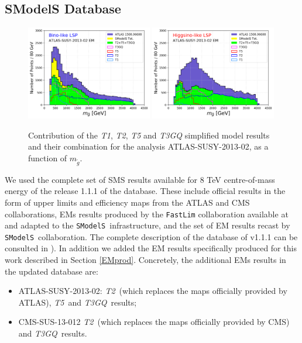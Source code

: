 \documentclass[preprint,number,sort&compress,twocolumn,3p]{elsstyarticle}
\newcommand{\SMO}{\texttt{SModelS\xspace}}
\newcommand{\MGLU}{$ m _{ \tilde g } $\xspace}
\newcommand{\TGQ}{ \textit{T3GQ}}
\newcommand{\Ttwo}{ \textit{T2}}
\newcommand{\Tfive}{ \textit{T5}}
\begin{document}
\subsection{SModelS Database}
\begin{figure}
	\begin{center}
		\subfigure
		{\includegraphics[width=0.49\textwidth]{PLOTS/Combination/Bino_Con.png}}
		\subfigure
		{\includegraphics[width=0.49\textwidth]{PLOTS/Combination/Higgsino_Con.png}}
	\end{center}
	\caption{Contribution of the \textit{T1}, \textit{T2}, \textit{T5} and \textit{T3GQ} simplified model results and their combination for the analysis ATLAS-SUSY-2013-02, as a function of \MGLU.} 
	\label{sms-histo}
\end{figure}
We used the complete set of SMS results available for 8 TeV centre-of-mass energy of the release 1.1.1 of the database. These include official results in the form of upper limits and efficiency maps from the ATLAS and CMS collaborations, EMs results produced by the \texttt{FastLim} collaboration available at \cite{fastlim:web} and adapted to the \SMO~infrastructure, and the set of EM results recast by \SMO~collaboration. The complete description of the database of v1.1.1 can be consulted in \cite{Ambrogi:2017lov}). In addition we added the EM results specifically produced for this work described in Section \ref{EMprod}. Concretely, the additional EMs results in the updated database are:
\begin{itemize}
	\item ATLAS-SUSY-2013-02: \Ttwo~(which replaces the maps officially provided by ATLAS), \Tfive~and \TGQ~results; \
	\item CMS-SUS-13-012 \Ttwo~(which replaces the maps officially provided by CMS) and \TGQ~results.
\end{itemize}
\end{document}
